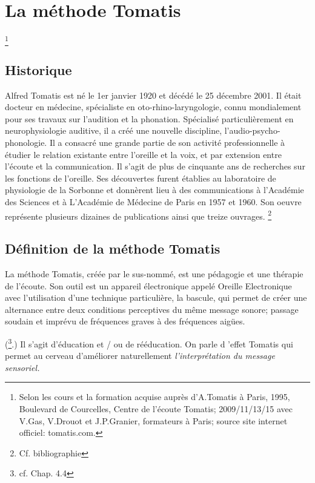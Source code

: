 \chapter{La méthode Tomatis}\footnote{Selon les cours et la formation acquise auprès d'A.Tomatis à Paris, 1995, Boulevard de Courcelles, Centre de l'écoute Tomatis;  2009/11/13/15 avec V.Gas, V.Drouot et J.P.Granier, formateurs à Paris; source site internet officiel: tomatis.com.}


\section{Historique} 

Alfred Tomatis est né le 1er janvier 1920 et décédé le 25 décembre
2001. Il était docteur en médecine, spécialiste en oto-rhino-laryngologie,
connu mondialement pour ses travaux sur l'audition et la phonation.
Spécialisé particulièrement en neurophysiologie auditive, il a créé
une nouvelle discipline, l'audio-psycho-phonologie. Il a consacré
une grande partie de son activité professionnelle à étudier le relation
existante entre l'oreille et la voix, et par extension entre l'écoute
et la communication. Il s'agit de plus de cinquante ans de recherches
sur les fonctions de l'oreille. Ses découvertes furent établies au
laboratoire de physiologie de la Sorbonne et donnèrent lieu à des
communications à l'Académie des Sciences et à L'Académie de Médecine
de Paris en 1957 et 1960. Son oeuvre représente plusieurs dizaines
de publications ainsi que treize ouvrages. \footnote{Cf. bibliographie}

\section{Définition de la méthode Tomatis} %



La méthode Tomatis, créée par le sus-nommé, est une pédagogie et une
thérapie de l'écoute. Son outil est un appareil électronique appelé
Oreille Electronique avec  l'utilisation d'une technique particulière, la bascule, qui permet de créer une alternance entre deux conditions perceptives du même message sonore; passage soudain et imprévu de fréquences graves à des fréquences aigües.

(\footnote{cf. Chap. 4.4}.) %
Il s'agit d'éducation
et / ou de rééducation. On parle d 'effet Tomatis qui permet au
cerveau d'améliorer naturellement \emph{l'interprétation du message
sensoriel.}

